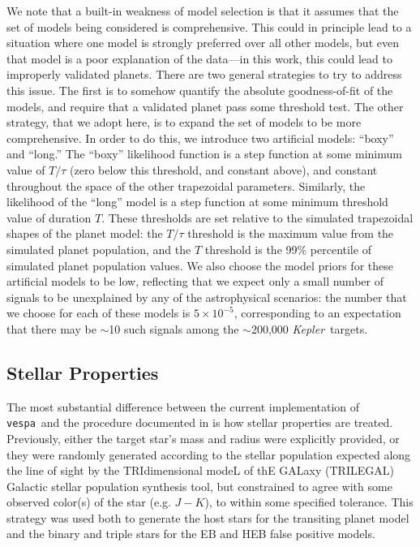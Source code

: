 \documentclass{emulateapj}
\newcommand{\sectlabel}[1]{\label{sect:#1}}
\newcommand{\kepler}{\textit{Kepler}}
\newcommand{\vespa}{\texttt{vespa}}
\begin{document}
We note that a built-in weakness of model selection is that it assumes that
the set of models being considered is comprehensive.  This could
in principle lead to a situation where one model is strongly preferred
over all other models, but even that model is a poor explanation of
the data---in this work, this could lead to improperly validated planets.  
There are two general strategies to try to address this issue.  The first 
is to somehow quantify the absolute goodness-of-fit of the models, and 
require that a validated planet pass some threshold test.  The other 
strategy, that we adopt here, is to expand the set of models to be more 
comprehensive.  In order to do this, we introduce two artificial models:
``boxy'' and ``long.''  The ``boxy'' likelihood function is a step function
at some minimum value of $T/\tau$ (zero below this threshold, and constant
above), and constant throughout the space of the other trapezoidal parameters.
Similarly, the likelihood of the ``long'' model is a step function at some
minimum threshold value of duration $T$.  These thresholds  
are set relative to the simulated trapezoidal shapes of the planet model:
the $T/\tau$ threshold is the maximum value from the simulated planet population,
and the $T$ threshold is the 99\% percentile of simulated planet
population values.  We also choose the model priors for these artificial
models to be low, reflecting that we expect only a small number of signals
to be unexplained by any of the astrophysical scenarios: the number that we
choose for each of these models is $5 \times 10^{-5}$, corresponding to an expectation
that there may be $\sim$10 such signals among the $\sim$200,000 \kepler\ targets.



\subsection{Stellar Properties}
\sectlabel{methods:stellar}

The most substantial difference between the current implementation of
\vespa\ and the procedure documented in  is
how stellar properties are treated.  Previously, either the target
star's mass and radius were explicitly provided, or they were randomly
generated according to the stellar population expected along the line
of sight by the TRIdimensional modeL of thE GALaxy (TRILEGAL) Galactic
stellar population synthesis tool, but constrained to agree with some
observed color(s) of the star (e.g. $J-K$), to within some specified
tolerance.  This strategy was used both to generate the host stars for
the transiting planet model and the binary and triple stars for the EB
and HEB false positive models.
\end{document}
